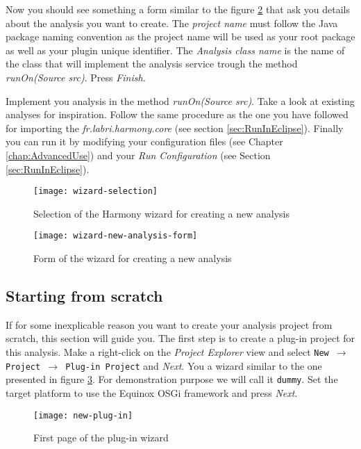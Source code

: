 Now you should see something a form similar to the figure \ref{fig:wizard-new-analysis-form} that ask you details about the analysis you want to create. The \emph{project name} must follow the Java package naming convention as the project name will be used as your root package as well as your plugin unique identifier. The \emph{Analysis class name} is the name of the class that will implement the analysis service trough the method \emph{runOn(Source src)}. Press \emph{Finish}.

Implement you analysis in the method \emph{runOn(Source src)}. Take a look at existing analyses for inspiration. Follow the same procedure as the one you have followed for importing the \emph{fr.labri.harmony.core} (see section \ref{sec:RunInEclipse}). Finally you can run it by modifying your configuration files (see Chapter \ref{chap:AdvancedUse}) and your \emph{Run Configuration} (see Section \ref{sec:RunInEclipse}).


	\begin{figure}[H]
		\centering
		\texttt{[image: wizard-selection]}
		\caption{Selection of the Harmony wizard for creating a new analysis}
		\label{fig:wizard-selection}
	\end{figure}
	
	\begin{figure}[H]
		\centering
		\texttt{[image: wizard-new-analysis-form]}
		\caption{Form of the wizard for creating a new analysis}
		\label{fig:wizard-new-analysis-form}
	\end{figure}


\subsection{Starting from scratch}\label{newAnalysis:fromScratch}

If for some inexplicable reason you want to create your analysis project from scratch, this section will guide you. The first step is to create a plug-in project for this analysis. Make a right-click on the \emph{Project Explorer} view and select \texttt{New $\rightarrow$ Project $\rightarrow$ Plug-in Project} and \emph{Next}. You a wizard similar to the one presented in figure \ref{fig:new-plug-in}. For demonstration purpose we will call it \texttt{dummy}. Set the target platform to use the Equinox OSGi framework and press \emph{Next}.

	\begin{figure}[H]
		\centering
		\texttt{[image: new-plug-in]}
		\caption{First page of the plug-in wizard}
		\label{fig:new-plug-in}
	\end{figure}
	
